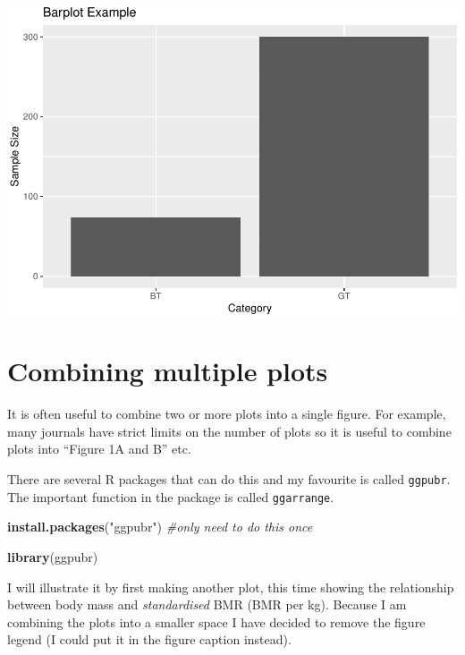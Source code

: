 \documentclass[
  a4paperpaper,
]{book}
\newenvironment{Shaded}{\begin{snugshade}}{\end{snugshade}}
\newcommand{\CommentTok}[1]{\textcolor[rgb]{0.56,0.35,0.01}{\textit{#1}}}
\newcommand{\KeywordTok}[1]{\textcolor[rgb]{0.13,0.29,0.53}{\textbf{#1}}}
\newcommand{\NormalTok}[1]{#1}
\newcommand{\StringTok}[1]{\textcolor[rgb]{0.31,0.60,0.02}{#1}}
\begin{document}
\begin{center}\includegraphics{BB852_files/figure-latex/unnamed-chunk-126-1} \end{center}

\hypertarget{combining-multiple-plots}{%
\section{Combining multiple plots}\label{combining-multiple-plots}}

It is often useful to combine two or more plots into a single figure. For example, many journals have strict limits on the number of plots so it is useful to combine plots into ``Figure 1A and B'' etc.

There are several R packages that can do this and my favourite is called \texttt{ggpubr}. The important function in the package is called \texttt{ggarrange}.

\begin{Shaded}
\begin{Highlighting}[]
\KeywordTok{install.packages}\NormalTok{(}\StringTok{"ggpubr"}\NormalTok{) }\CommentTok{\#only need to do this once}
\end{Highlighting}
\end{Shaded}

\begin{Shaded}
\begin{Highlighting}[]
\KeywordTok{library}\NormalTok{(ggpubr)}
\end{Highlighting}
\end{Shaded}

I will illustrate it by first making another plot, this time showing the relationship between body mass and \emph{standardised} BMR (BMR per kg). Because I am combining the plots into a smaller space I have decided to remove the figure legend (I could put it in the figure caption instead).
\end{document}
